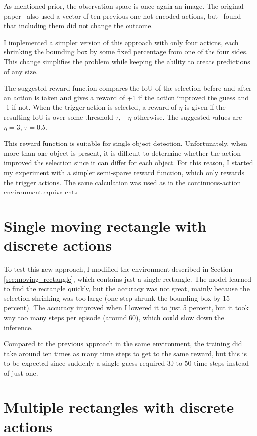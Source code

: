 \documentclass[
  digital,     %
  oneside,     %
  nosansbold,  %
  nocolorbold, %
  lof,         %
  lot,         %
]{fithesis4}
\begin{document}
As mentioned prior, the observation space is once again an image. The original paper~\cite{iterative_od_with_rl} also used a vector of ten previous one-hot encoded actions, but~\cite{rl_object_detection} found that including them did not change the outcome.

I implemented a simpler version of this approach with only four actions, each shrinking the bounding box by some fixed percentage from one of the four sides. This change simplifies the problem while keeping the ability to create predictions of any size.

The suggested reward function compares the IoU of the selection before and after an action is taken and gives a reward of +1 if the action improved the guess and -1 if not. When the trigger action is selected, a reward of $\eta$ is given if the resulting IoU is over some threshold $\tau$, $-\eta$ otherwise. The suggested values are $\eta=3$, $\tau=0.5$.

This reward function is suitable for single object detection. Unfortunately, when more than one object is present, it is difficult to determine whether the action improved the selection since it can differ for each object. For this reason, I started my experiment with a simpler semi-sparse reward function, which only rewards the trigger actions. The same calculation was used as in the continuous-action environment equivalents.

\section{Single moving rectangle with discrete actions}

To test this new approach, I modified the environment described in Section \ref{sec:moving_rectangle}, which contains just a single rectangle. The model learned to find the rectangle quickly, but the accuracy was not great, mainly because the selection shrinking was too large (one step shrunk the bounding box by 15 percent). The accuracy improved when I lowered it to just 5 percent, but it took way too many steps per episode (around 60), which could slow down the inference.

Compared to the previous approach in the same environment, the training did take around ten times as many time steps to get to the same reward, but this is to be expected since suddenly a single guess required 30 to 50 time steps instead of just one.

\section{Multiple rectangles with discrete actions}
\end{document}
